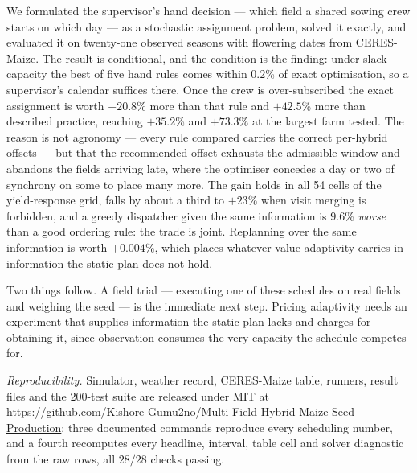 \documentclass[10pt,twocolumn]{article}
\begin{document}
We formulated the supervisor's hand decision --- which field a shared sowing
crew starts on which day --- as a stochastic assignment problem, solved it
exactly, and evaluated it on twenty-one observed seasons with flowering
dates from CERES-Maize. The result is conditional, and the condition is the
finding: under slack capacity the best of five hand rules comes within
$0.2$\% of exact optimisation, so a supervisor's calendar suffices there.
Once the crew is over-subscribed the exact assignment
is worth $+20.8$\% more than that rule and $+42.5$\% more than described
practice, reaching $+35.2$\% and $+73.3$\% at the largest farm tested. The
reason is not agronomy --- every rule compared carries the correct
per-hybrid offsets --- but that the recommended offset exhausts the
admissible window and abandons the fields arriving late, where the optimiser
concedes a day or two of synchrony on some to place many more. The gain
holds in all 54 cells of the yield-response grid, falls by about a third to
$+23$\% when visit merging is forbidden, and a greedy dispatcher given the
same information is $9.6$\% \emph{worse} than a good ordering rule: the
trade is joint. Replanning over the same information is worth $+0.004$\%,
which places whatever value adaptivity carries in information the static
plan does not hold.

Two things follow. A field trial --- executing one of these schedules on
real fields and weighing the seed --- is the immediate next step. Pricing
adaptivity needs an experiment that supplies information the static plan
lacks and charges for obtaining it, since observation consumes the very
capacity the schedule competes for.

\emph{Reproducibility.} Simulator, weather record, CERES-Maize table,
runners, result files and the 200-test suite are released under MIT at
\textcolor{ieeelink}{\url{https://github.com/Kishore-Gumu2no/Multi-Field-Hybrid-Maize-Seed-Production}};
three documented commands reproduce every scheduling number, and a fourth
recomputes every headline, interval, table cell and solver diagnostic from
the raw rows, all $28/28$ checks passing.
\end{document}
